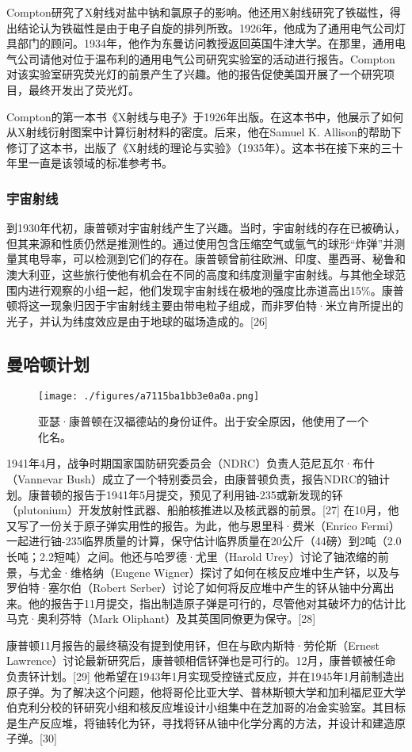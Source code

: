 Compton研究了X射线对盐中钠和氯原子的影响。他还用X射线研究了铁磁性，得出结论认为铁磁性是由于电子自旋的排列所致。1926年，他成为了通用电气公司灯具部门的顾问。1934年，他作为东曼访问教授返回英国牛津大学。在那里，通用电气公司请他对位于温布利的通用电气公司研究实验室的活动进行报告。Compton对该实验室研究荧光灯的前景产生了兴趣。他的报告促使美国开展了一个研究项目，最终开发出了荧光灯。

Compton的第一本书《X射线与电子》于1926年出版。在这本书中，他展示了如何从X射线衍射图案中计算衍射材料的密度。后来，他在Samuel K. Allison的帮助下修订了这本书，出版了《X射线的理论与实验》（1935年）。这本书在接下来的三十年里一直是该领域的标准参考书。
\subsubsection{宇宙射线}  
到1930年代初，康普顿对宇宙射线产生了兴趣。当时，宇宙射线的存在已被确认，但其来源和性质仍然是推测性的。通过使用包含压缩空气或氩气的球形“炸弹”并测量其电导率，可以检测到它们的存在。康普顿曾前往欧洲、印度、墨西哥、秘鲁和澳大利亚，这些旅行使他有机会在不同的高度和纬度测量宇宙射线。与其他全球范围内进行观察的小组一起，他们发现宇宙射线在极地的强度比赤道高出15\%。康普顿将这一现象归因于宇宙射线主要由带电粒子组成，而非罗伯特·米立肯所提出的光子，并认为纬度效应是由于地球的磁场造成的。[26]
\subsection{曼哈顿计划}
\begin{figure}[ht]
\centering
\texttt{[image: ./figures/a7115ba1bb3e0a0a.png]}
\caption{亚瑟·康普顿在汉福德站的身份证件。出于安全原因，他使用了一个化名。} \label{fig_KPD_5}
\end{figure}
1941年4月，战争时期国家国防研究委员会（NDRC）负责人范尼瓦尔·布什（Vannevar Bush）成立了一个特别委员会，由康普顿负责，报告NDRC的铀计划。康普顿的报告于1941年5月提交，预见了利用铀-235或新发现的钚（plutonium）开发放射性武器、船舶核推进以及核武器的前景。[27] 在10月，他又写了一份关于原子弹实用性的报告。为此，他与恩里科·费米（Enrico Fermi）一起进行铀-235临界质量的计算，保守估计临界质量在20公斤（44磅）到2吨（2.0长吨；2.2短吨）之间。他还与哈罗德·尤里（Harold Urey）讨论了铀浓缩的前景，与尤金·维格纳（Eugene Wigner）探讨了如何在核反应堆中生产钚，以及与罗伯特·塞尔伯（Robert Serber）讨论了如何将反应堆中产生的钚从铀中分离出来。他的报告于11月提交，指出制造原子弹是可行的，尽管他对其破坏力的估计比马克·奥利芬特（Mark Oliphant）及其英国同僚更为保守。[28]

康普顿11月报告的最终稿没有提到使用钚，但在与欧内斯特·劳伦斯（Ernest Lawrence）讨论最新研究后，康普顿相信钚弹也是可行的。12月，康普顿被任命负责钚计划。[29] 他希望在1943年1月实现受控链式反应，并在1945年1月前制造出原子弹。为了解决这个问题，他将哥伦比亚大学、普林斯顿大学和加利福尼亚大学伯克利分校的钚研究小组和核反应堆设计小组集中在芝加哥的冶金实验室。其目标是生产反应堆，将铀转化为钚，寻找将钚从铀中化学分离的方法，并设计和建造原子弹。[30]

